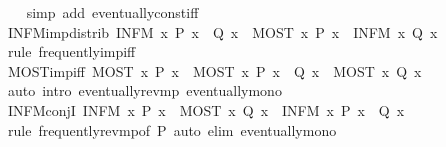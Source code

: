 \begin{isabellebody}
%
\isadelimproof
\ \ %
\endisadelimproof
%
\isatagproof
{}\isamarkupfalse%
\ {\isacharparenleft}simp\ add{\isacharcolon}\ eventually{\isacharunderscore}const{\isacharunderscore}iff{\isacharparenright}%
\endisatagproof
{\isafoldproof}%
%
\isadelimproof
\isanewline
%
\endisadelimproof
\isanewline
{}\isamarkupfalse%
\ INFM{\isacharunderscore}imp{\isacharunderscore}distrib{\isacharcolon}\ {\isachardoublequoteopen}{\isacharparenleft}INFM\ x{\isachardot}\ P\ x\ {\isasymlongrightarrow}\ Q\ x{\isacharparenright}\ {\isasymlongleftrightarrow}\ {\isacharparenleft}{\isacharparenleft}MOST\ x{\isachardot}\ P\ x{\isacharparenright}\ {\isasymlongrightarrow}\ {\isacharparenleft}INFM\ x{\isachardot}\ Q\ x{\isacharparenright}{\isacharparenright}{\isachardoublequoteclose}\isanewline
%
\isadelimproof
\ \ %
\endisadelimproof
%
\isatagproof
{}\isamarkupfalse%
\ {\isacharparenleft}rule\ frequently{\isacharunderscore}imp{\isacharunderscore}iff{\isacharparenright}%
\endisatagproof
{\isafoldproof}%
%
\isadelimproof
\isanewline
%
\endisadelimproof
\isanewline
{}\isamarkupfalse%
\ MOST{\isacharunderscore}imp{\isacharunderscore}iff{\isacharcolon}\ {\isachardoublequoteopen}MOST\ x{\isachardot}\ P\ x\ {\isasymLongrightarrow}\ {\isacharparenleft}MOST\ x{\isachardot}\ P\ x\ {\isasymlongrightarrow}\ Q\ x{\isacharparenright}\ {\isasymlongleftrightarrow}\ {\isacharparenleft}MOST\ x{\isachardot}\ Q\ x{\isacharparenright}{\isachardoublequoteclose}\isanewline
%
\isadelimproof
\ \ %
\endisadelimproof
%
\isatagproof
{}\isamarkupfalse%
\ {\isacharparenleft}auto\ intro{\isacharcolon}\ eventually{\isacharunderscore}rev{\isacharunderscore}mp\ eventually{\isacharunderscore}mono{\isacharparenright}%
\endisatagproof
{\isafoldproof}%
%
\isadelimproof
\isanewline
%
\endisadelimproof
\isanewline
{}\isamarkupfalse%
\ INFM{\isacharunderscore}conjI{\isacharcolon}\ {\isachardoublequoteopen}INFM\ x{\isachardot}\ P\ x\ {\isasymLongrightarrow}\ MOST\ x{\isachardot}\ Q\ x\ {\isasymLongrightarrow}\ INFM\ x{\isachardot}\ P\ x\ {\isasymand}\ Q\ x{\isachardoublequoteclose}\isanewline
%
\isadelimproof
\ \ %
\endisadelimproof
%
\isatagproof
{}\isamarkupfalse%
\ {\isacharparenleft}rule\ frequently{\isacharunderscore}rev{\isacharunderscore}mp{\isacharbrackleft}of\ P{\isacharbrackright}{\isacharparenright}\ {\isacharparenleft}auto\ elim{\isacharcolon}\ eventually{\isacharunderscore}mono{\isacharparenright}%
\endisatagproof
{\isafoldproof}%
%
\isadelimproof
%
\endisadelimproof
%
\begin{isamarkuptext}%

\end{isamarkuptext}
\end{isabellebody}

